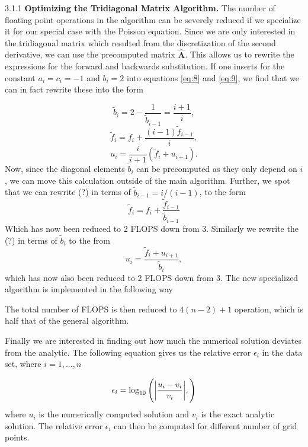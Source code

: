 \documentclass[a4paper,10pt]{article}
\begin{document}
\bigskip

3.1.1 \textbf{Optimizing the Tridiagonal Matrix Algorithm.}
The number of floating point operations in the algorithm can be severely reduced if we specialize it for our special case with the Poisson equation. Since we are only interested in the tridiagonal matrix which resulted from the discretization of the second derivative, we can use the precomputed matrix $\mathbf{\hat{A}}$. This allows us to rewrite the expressions for the forward and backwards substitution. If one inserts for the constant $a_i =  c_i = -1$ and $b_i = 2$ into equations \eqref{eq:8} and \eqref{eq:9}, we find that we can in fact rewrite these into the form

\begin{equation}\label{eq:10}
\tilde{b}_i = 2 - \frac{1}{\tilde{b}_{i-1}} = \frac{i+1}{i},
\end{equation}
\begin{equation}\label{eq:11}
\tilde{f}_i = f_i + \frac{(i-1)\tilde{f}_{i-1}}{i},
\end{equation}
\begin{equation}\label{eq:12}
u_{i} = \frac{i}{i+1}(\tilde{f}_{i} +u_{i+1}).
\end{equation}
Now, since the diagonal elements $\tilde{b}_i$ can be precomputed as they only depend on $i$, we can move this calculation outside of the main algorithm. Further, we spot that we can rewrite (?) in terms of $\tilde{b}_{i-1} = i/(i-1) $, to the form
\begin{equation}\label{eq:13}
\tilde{f}_i = f_i + \frac{\tilde{f}_{i-1}}{\tilde{b}_{i-1}}
\end{equation}
Which has now been reduced to 2 FLOPS down from 3. Similarly we rewrite the (?) in terms of $\tilde{b}_i$ to the from
\begin{equation}\label{eq:14}
u_i = \frac{\tilde{f}_i + u_{i+1}}{\tilde{b}_i},
\end{equation}
which has now also been reduced to 2 FLOPS down from 3. 
The new specialized algorithm is implemented in the
 following way

The total number of FLOPS is then reduced to $4(n-2) + 1$ operation, which is half that of the general algorithm. 

Finally we are interested in finding out how much the numerical solution deviates from the analytic. The following equation gives us the relative error $\epsilon_i$ in the data set, where $i = 1, ...,n$

\begin{equation}\label{eq:15}
\epsilon_i = \log_{10} \left( \abs{\frac{u_i - v_i}{v_i}}, \right)
\end{equation}
where $u_i$ is the numerically computed solution and $v_i$ is the exact analytic solution. The relative error $\epsilon_i$ can then be computed for different number of grid points. 
\end{document}

